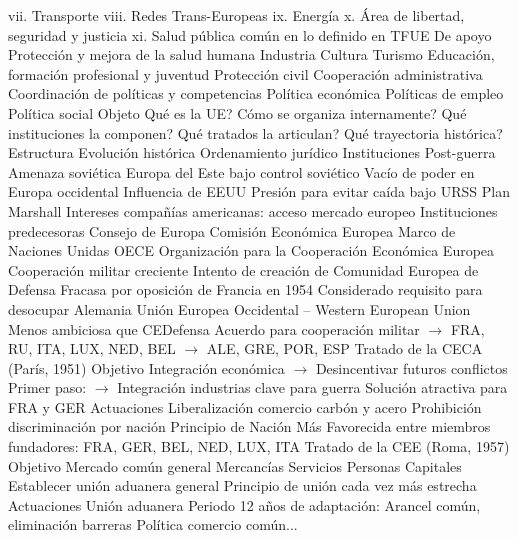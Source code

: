 \documentclass{nuevotema}
\begin{document}
\begin{esquemal}
				\4[] vii. Transporte
				\4[] viii. Redes Trans-Europeas
				\4[] ix. Energía
				\4[] x. Área de libertad, seguridad y justicia
				\4[] xi. Salud pública común en lo definido en TFUE
				\4 De apoyo
				\4[] Protección y mejora de la salud humana
				\4[] Industria
				\4[] Cultura
				\4[] Turismo
				\4[] Educación, formación profesional y juventud
				\4[] Protección civil
				\4[] Cooperación administrativa
				\4 Coordinación de políticas y competencias
				\4[] Política económica
				\4[] Políticas de empleo
				\4[] Política social
		\2 Objeto
			\3 Qué es la UE?
			\3 Cómo se organiza internamente?
			\3 Qué instituciones la componen?
			\3 Qué tratados la articulan?
			\3 Qué trayectoria histórica?
		\2 Estructura
			\3 Evolución histórica
			\3 Ordenamiento jurídico
			\3 Instituciones
	\1 
		\2 Post-guerra
			\3 Amenaza soviética
				\4 Europa del Este bajo control soviético
				\4 Vacío de poder en Europa occidental
			\3 Influencia de EEUU
				\4 Presión para evitar caída bajo URSS
				\4 Plan Marshall
				\4 Intereses compañías americanas:
				\4[] acceso mercado europeo
			\3 Instituciones predecesoras
				\4 Consejo de Europa
				\4 Comisión Económica Europea
				\4[] Marco de Naciones Unidas
				\4 OECE
				\4[] Organización para la Cooperación Económica Europea
				\4 Cooperación militar creciente
				\4[] Intento de creación de Comunidad Europea de Defensa
				\4[] Fracasa por oposición de Francia en 1954
				\4[] Considerado requisito para desocupar Alemania
				\4 Unión Europea Occidental -- Western European Union
				\4[] Menos ambiciosa que CEDefensa
				\4[] Acuerdo para cooperación militar
				\4[] $\to$ FRA, RU, ITA, LUX, NED, BEL
				\4[] $\to$ ALE, GRE, POR, ESP
		\2 Tratado de la CECA (París, 1951)
			\3 Objetivo
				\4 Integración económica
				\4[] $\to$ Desincentivar futuros conflictos
				\4 Primer paso:
				\4[] $\to$ Integración industrias clave para guerra
				\4 Solución atractiva para FRA y GER
			\3 Actuaciones
				\4 Liberalización comercio carbón y acero
				\4 Prohibición discriminación por nación
				\4[] Principio de Nación Más Favorecida entre miembros
				 fundadores: FRA, GER, BEL, NED, LUX, ITA
		\2 Tratado de la CEE (Roma, 1957)
			\3 Objetivo
				\4 Mercado común general
				\4[] Mercancías
				\4[] Servicios
				\4[] Personas
				\4[] Capitales
				\4 Establecer unión aduanera general
				\4 Principio de unión cada vez más estrecha
			\3 Actuaciones
				\4 Unión aduanera
				\4 Periodo 12 años de adaptación:
				\4[] Arancel común, eliminación barreras
				\4[] Política comercio común...

\end{esquemal}
\end{document}
